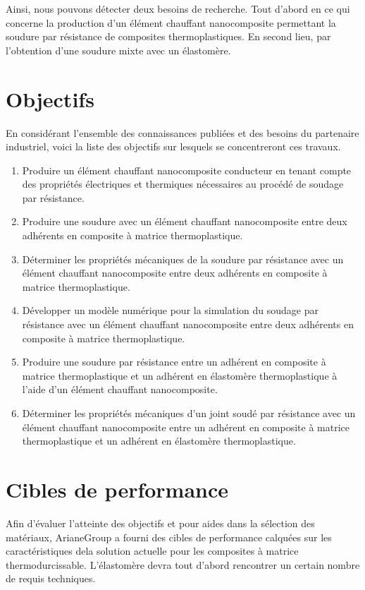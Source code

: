 Ainsi, nous pouvons détecter deux besoins de recherche. 
Tout d'abord en ce qui concerne la production d'un élément chauffant nanocomposite permettant la soudure par résistance de composites thermoplastiques. 
En second lieu, par l'obtention d'une soudure mixte avec un élastomère. 

\section{Objectifs}

En considérant l'ensemble des connaissances publiées et des besoins du partenaire industriel, voici la liste des objectifs sur lesquels se concentreront ces travaux. 

\begin{enumerate}
	\item Produire un élément chauffant nanocomposite conducteur en tenant compte des propriétés électriques et thermiques nécessaires au procédé de soudage par résistance. 
	\item Produire une soudure avec un élément chauffant nanocomposite entre deux adhérents en composite à matrice thermoplastique. 
	\item Déterminer les propriétés mécaniques de la soudure par résistance avec un élément chauffant nanocomposite entre deux adhérents en composite à matrice thermoplastique. 
	\item Développer un modèle numérique pour la simulation du soudage par résistance avec un élément chauffant nanocomposite entre deux adhérents en composite à matrice thermoplastique. 
	\item Produire une soudure par résistance entre un adhérent en composite à matrice thermoplastique et un adhérent en élastomère thermoplastique à l'aide d'un élément chauffant nanocomposite. 
	\item Déterminer les propriétés mécaniques d'un joint soudé par résistance avec un élément chauffant nanocomposite entre un adhérent en composite à matrice thermoplastique et un adhérent en élastomère thermoplastique. 
\end{enumerate}

\section{Cibles de performance}

Afin d'évaluer l'atteinte des objectifs et pour aides dans la sélection des matériaux, ArianeGroup a fourni des cibles de performance calquées sur les caractéristiques dela solution actuelle pour les composites à matrice thermodurcissable. 
L'élastomère devra tout d'abord rencontrer un certain nombre de requis techniques. 

